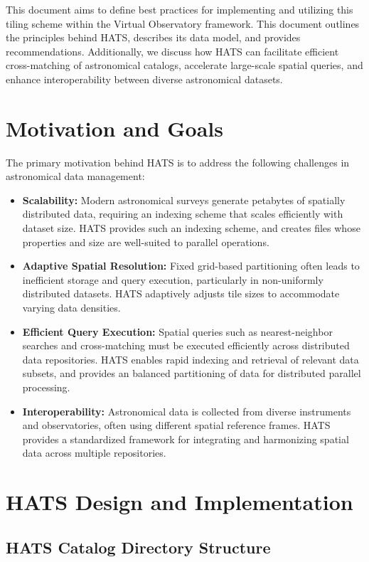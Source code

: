 \documentclass[11pt,a4paper]{ivoa}
\begin{document}
This document aims to define best practices for implementing and utilizing this tiling scheme within the Virtual Observatory framework. 
This document outlines the principles behind HATS, describes its data model, and provides recommendations. 
Additionally, we discuss how HATS can facilitate efficient cross-matching of astronomical catalogs, accelerate large-scale spatial queries, and enhance interoperability between diverse astronomical datasets.

\section{Motivation and Goals}
The primary motivation behind HATS is to address the following challenges in astronomical data management:
\begin{itemize}
    \item \textbf{Scalability:} Modern astronomical surveys generate petabytes of spatially distributed data, requiring an indexing scheme that scales efficiently with dataset size.
    HATS provides such an indexing scheme, and creates files whose properties and size are well-suited to parallel operations.
    \item \textbf{Adaptive Spatial Resolution:} Fixed grid-based partitioning often leads to inefficient storage and query execution, particularly in non-uniformly distributed datasets. 
    HATS adaptively adjusts tile sizes to accommodate varying data densities.
    \item \textbf{Efficient Query Execution:} Spatial queries such as nearest-neighbor searches and cross-matching must be executed efficiently across distributed data repositories. 
    HATS enables rapid indexing and retrieval of relevant data subsets, and provides an balanced partitioning of data for distributed parallel processing.
    \item \textbf{Interoperability:} Astronomical data is collected from diverse instruments and observatories, often using different spatial reference frames. 
    HATS provides a standardized framework for integrating and harmonizing spatial data across multiple repositories.
\end{itemize}

\section{HATS Design and Implementation}

\subsection{HATS Catalog Directory Structure} \label{sec:catalog}
\end{document}
